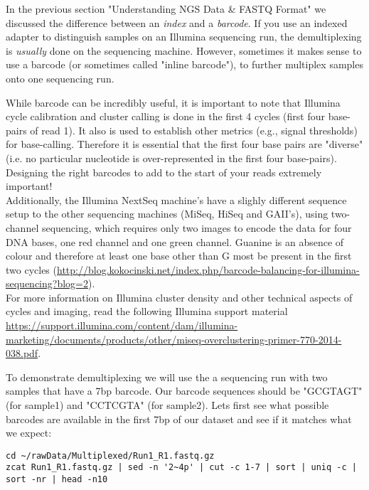 In the previous section "Understanding NGS Data \& FASTQ Format" we discussed the difference between an \textit{index} and a \textit{barcode}. If you use an indexed adapter to distinguish samples on an Illumina sequencing run, the demultiplexing is \textit{usually} done on the sequencing machine. However, sometimes it makes sense to use a barcode (or sometimes called "inline barcode"), to further multiplex samples onto one sequencing run.\\

\begin{note}
While barcode can be incredibly useful, it is important to note that Illumina cycle calibration and cluster calling is done in the first 4 cycles (first four base-pairs of read 1). It also is used to establish other metrics (e.g., signal thresholds) for base-calling.
Therefore it is essential that the first four base pairs are "diverse" (i.e. no particular nucleotide is over-represented in the first four base-pairs). Designing the right barcodes to add to the start of your reads extremely important! \\
Additionally, the Illumina NextSeq machine's have a slighly different sequence setup to the other sequencing machines (MiSeq, HiSeq and GAII's), using two-channel sequencing, which requires only two images to encode the data for four DNA bases, one red channel and one green channel. Guanine is an absence of colour and therefore at least one base other than G most be present in the first two cycles (\url{http://blog.kokocinski.net/index.php/barcode-balancing-for-illumina-sequencing?blog=2}). \\
For more information on Illumina cluster density and other technical aspects of cycles and imaging, read the following Illumina support material \url{https://support.illumina.com/content/dam/illumina-marketing/documents/products/other/miseq-overclustering-primer-770-2014-038.pdf}.
\end{note}

\begin{steps}
To demonstrate demultiplexing we will use the a sequencing run with two samples that have a 7bp barcode. Our barcode sequences should be "GCGTAGT" (for sample1) and "CCTCGTA" (for sample2). Lets first see what possible barcodes are available in the first 7bp of our dataset and see if it matches what we expect:
\begin{lstlisting}
cd ~/rawData/Multiplexed/Run1_R1.fastq.gz
zcat Run1_R1.fastq.gz | sed -n '2~4p' | cut -c 1-7 | sort | uniq -c | sort -nr | head -n10
\end{lstlisting}
\end{steps}

